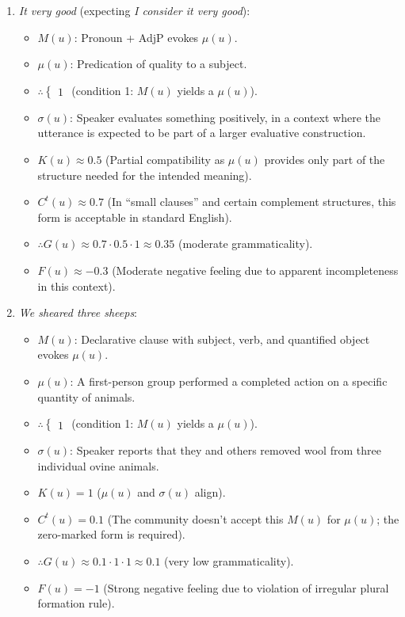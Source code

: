 \documentclass[12pt,letterpaper]{article}
\begin{document}
\begin{enumerate}
    \item \textit{It very good} (expecting \textit{I consider it very good}):
    \begin{itemize}
    \item \(M(u)\): Pronoun + AdjP evokes \(\mu(u)\).
    \item \(\mu(u)\): Predication of quality to a subject.
    \item \(\therefore \begin{cases} 1 \end{cases}\) (condition 1: \(M(u)\) yields a \(\mu(u)\)).
    \item \(\sigma(u)\): Speaker evaluates something positively, in a context where the utterance is expected to be part of a larger evaluative construction.
    \item \(K(u) \approx 0.5\) (Partial compatibility as \(\mu(u)\) provides only part of the structure needed for the intended meaning).
    \item \(C^t(u) \approx 0.7\) (In \enquote{small clauses} and certain complement structures, this form is acceptable in standard English).
    \item \(\therefore G(u) \approx 0.7 \cdot 0.5 \cdot 1 \approx 0.35\) (moderate grammaticality).
    \item \(F(u) \approx -0.3\) (Moderate negative feeling due to apparent incompleteness in this context).
    \end{itemize}

    \item \textit{We sheared three sheeps}:
    \begin{itemize}
        \item \(M(u)\): Declarative clause with subject, verb, and quantified object evokes \(\mu(u)\).
        \item \(\mu(u)\): A first-person group performed a completed action on a specific quantity of animals.
        \item \(\therefore \begin{cases} 1 \end{cases}\) (condition 1: \(M(u)\) yields a \(\mu(u)\)).
        \item \(\sigma(u)\): Speaker reports that they and others removed wool from three individual ovine animals.
        \item \(K(u) = 1\) (\(\mu(u)\) and \(\sigma(u)\) align).
        \item \(C^t(u) = 0.1\) (The community doesn't accept this \(M(u)\) for \(\mu(u)\); the zero-marked form is required).
        \item \(\therefore G(u) \approx 0.1 \cdot 1 \cdot 1 \approx 0.1\) (very low grammaticality).
        \item \(F(u) = -1\) (Strong negative feeling due to violation of irregular plural formation rule).
    \end{itemize}


\end{enumerate}
\end{document}
